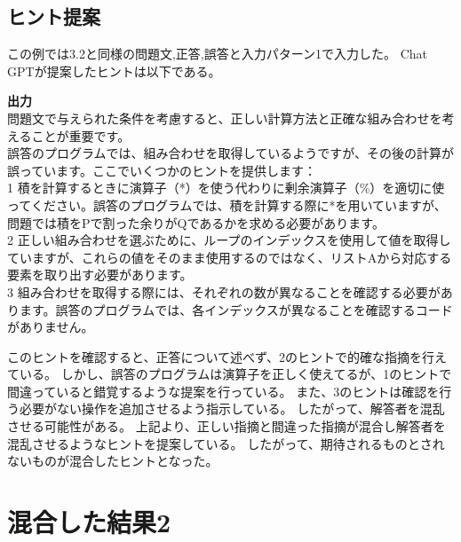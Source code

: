 \subsection{ヒント提案}
この例では3.2と同様の問題文,正答,誤答と入力パターン1で入力した。
Chat GPTが提案したヒントは以下である。
\begin{screen}
\textbf{出力}\\
問題文で与えられた条件を考慮すると、正しい計算方法と正確な組み合わせを考えることが重要です。\\
誤答のプログラムでは、組み合わせを取得しているようですが、その後の計算が誤っています。ここでいくつかのヒントを提供します：\\
1 積を計算するときに演算子（*）を使う代わりに剰余演算子（\%）を適切に使ってください。誤答のプログラムでは、積を計算する際に*を用いていますが、問題では積をPで割った余りがQであるかを求める必要があります。\\
2 正しい組み合わせを選ぶために、ループのインデックスを使用して値を取得していますが、これらの値をそのまま使用するのではなく、リストAから対応する要素を取り出す必要があります。\\
3 組み合わせを取得する際には、それぞれの数が異なることを確認する必要があります。誤答のプログラムでは、各インデックスが異なることを確認するコードがありません。
\end{screen}
このヒントを確認すると、正答について述べず、2のヒントで的確な指摘を行えている。
しかし、誤答のプログラムは演算子を正しく使えてるが、1のヒントで間違っていると錯覚するような提案を行っている。
また、3のヒントは確認を行う必要がない操作を追加させるよう指示している。
したがって、解答者を混乱させる可能性がある。
上記より、正しい指摘と間違った指摘が混合し解答者を混乱させるようなヒントを提案している。
したがって、期待されるものとされないものが混合したヒントとなった。

\section{混合した結果2}

